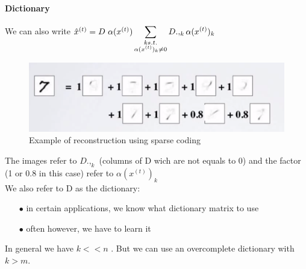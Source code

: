 \paragraph{Dictionary}
We can also write $\hat{x}^{(t)} = D\hspace{3px} \alpha(x^{(t)}) \displaystyle\sum_{\substack{k s.t.\\ \alpha(x^{(t)})_k\neq 0}}  D.,_k \alpha(x^{(t)} )_k$
\begin{figure}[h]
 \centering
 \includegraphics[scale=0.5]{spacecoding_1.png}
  \caption{Example of reconstruction using sparse coding}
\end{figure}

The images refer to $D.,_k$ (columns of D wich are not equals to 0) and the factor (1 or 0.8 in this case) refer to $\alpha(x^{(t)} )_k$
\\We also refer to D as the dictionary:
\begin{itemize}
 \item[$\bullet$]in certain applications, we know what dictionary matrix to use
 \item[$\bullet$]often however, we have to learn it
\end{itemize}

In general we have $k<<n$ . But we can use an overcomplete dictionary with $k > m$.
